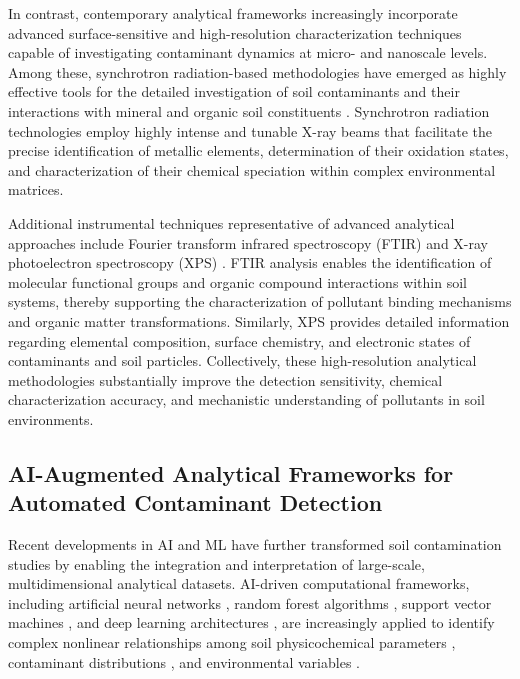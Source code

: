 \documentclass[land,article,submit,pdftex,moreauthors]{Definitions/mdpi}
\begin{document}
In contrast, contemporary analytical frameworks increasingly incorporate
advanced surface-sensitive and high-resolution characterization techniques
capable of investigating contaminant dynamics at micro- and nanoscale levels.
Among these, synchrotron radiation-based methodologies have emerged as highly
effective tools for the detailed investigation of soil contaminants and their
interactions with mineral and organic soil constituents
\cite{Hu2020,Rosskopfova2012,LindhLemenkova2023a}. Synchrotron radiation
technologies employ highly intense and tunable X-ray beams that facilitate
the precise identification of metallic elements, determination of their
oxidation states, and characterization of their chemical speciation within
complex environmental matrices.

Additional instrumental techniques representative of advanced analytical
approaches include Fourier transform infrared spectroscopy (FTIR)
\cite{Xu2026} and X-ray photoelectron spectroscopy (XPS)
\cite{Guo2025,LindhLemenkova2023c}. FTIR analysis enables the identification
of molecular functional groups and organic compound interactions within soil
systems, thereby supporting the characterization of pollutant binding
mechanisms and organic matter transformations. Similarly, XPS provides
detailed information regarding elemental composition, surface chemistry, and
electronic states of contaminants and soil particles. Collectively, these
high-resolution analytical methodologies substantially improve the detection
sensitivity, chemical characterization accuracy, and mechanistic understanding
of pollutants in soil environments.

\subsection{AI-Augmented Analytical Frameworks for Automated Contaminant
    Detection}\label{sec3.2}

Recent developments in AI and ML have further transformed soil contamination
studies by enabling the integration and interpretation of large-scale,
multidimensional analytical datasets. AI-driven computational frameworks,
including artificial neural networks \cite{Aljanabi2025,Anifowose2024}, random
forest algorithms \cite{Shaheen2018,Foronda2023}, support vector machines
\cite{Agyeman2022,Gholizadeh2020}, and deep learning architectures
\cite{Hu2024,MLReview2024}, are increasingly applied to identify complex
nonlinear relationships among soil physicochemical parameters
\cite{Aljanabi2025,Kammerlander2025}, contaminant distributions
\cite{Agyeman2022,Shaheen2018}, and environmental variables
\cite{Anifowose2024,Gholizadeh2020}.
\end{document}
